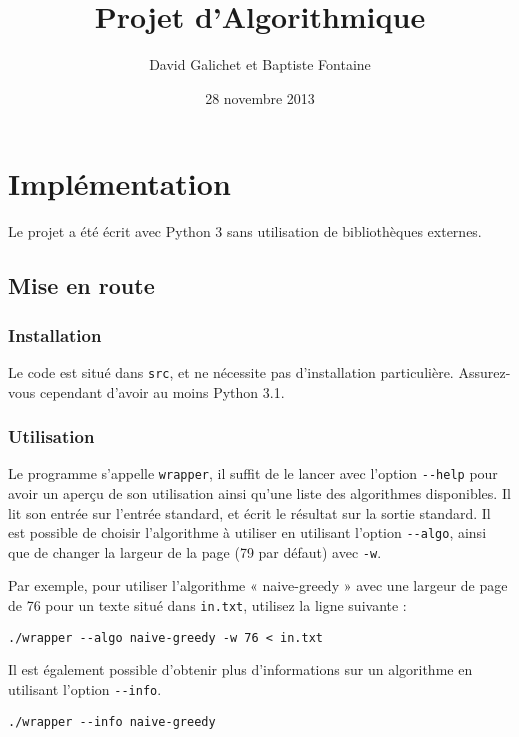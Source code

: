 \documentclass{article}
\begin{document}
\title{Projet d'Algorithmique}
\author{David Galichet et Baptiste Fontaine}
\date{28 novembre 2013}
\maketitle

\chapter{Implémentation}

Le projet a été écrit avec Python 3 sans utilisation de bibliothèques externes.

\section{Mise en route}
\subsection{Installation}

Le code est situé dans \verb|src|, et ne nécessite pas d'installation
particulière. Assurez-vous cependant d'avoir au moins Python 3.1.

\subsection{Utilisation}

Le programme s'appelle \verb|wrapper|, il suffit de le lancer avec l'option
\verb|--help| pour avoir un aperçu de son utilisation ainsi qu'une liste des
algorithmes disponibles. Il lit son entrée sur l'entrée standard, et écrit le
résultat sur la sortie standard. Il est possible de choisir l'algorithme à
utiliser en utilisant l'option \verb|--algo|, ainsi que de changer la largeur
de la page (79 par défaut) avec \verb|-w|.

Par exemple, pour utiliser l'algorithme « naive-greedy » avec une largeur de
page de 76 pour un texte situé dans \verb|in.txt|, utilisez la ligne suivante
:

\begin{verbatim}
./wrapper --algo naive-greedy -w 76 < in.txt
\end{verbatim}

Il est également possible d'obtenir plus d'informations sur un algorithme en
utilisant l'option \verb|--info|.

\begin{verbatim}
./wrapper --info naive-greedy
\end{verbatim}
\end{document}
